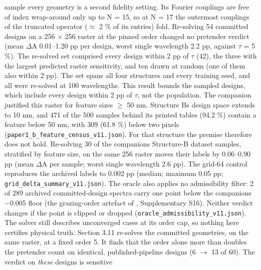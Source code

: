 \documentclass[11pt,a4paper]{article}
\begin{document}
\begin{itemize}
  sample every geometry is a second fidelity setting. Its Fourier couplings are free of
  index wrap-around only up to N = 15, so at N = 17 the outermost couplings of the
  truncated operator (\ensuremath{\approx} 2 \% of its entries) fold. Re-solving 54 committed designs on a
  256 \ensuremath{\times} 256 raster at the pinned order changed no pretender verdict (mean \textbar \ensuremath{\Delta}A\textbar{}
  0.01--1.20 pp per design, worst single wavelength 2.2 pp, against \ensuremath{\tau} = 5 \%). The re-solved
  set comprised every design within 2 pp of \ensuremath{\tau} (42), the three with the largest predicted
  raster sensitivity, and ten drawn at random (one of them also within 2 pp). The set
  spans all four structures and every training seed, and all were re-solved at 100
  wavelengths. This result bounds the sampled designs, which include every design within
  2 pp of \ensuremath{\tau}, not the population. The companion justified this raster for feature
  sizes \ensuremath{\geq} 50 nm. Structure B\textquotesingle s design space extends to 10 nm, and 471 of the 500 samples
  behind its printed tables (94.2 \%) contain a feature below 50 nm, with 309 (61.8 \%)
  below two pixels (\texttt{paper1\_\allowbreak{}b\_\allowbreak{}feature\_\allowbreak{}census\_\allowbreak{}v11.\allowbreak{}json}). For that structure the premise
  therefore does not hold. Re-solving 30 of the companion\textquotesingle s Structure-B dataset samples,
  stratified by feature size, on the same 256 raster moves their labels by 0.06--0.90 pp
  (mean \textbar \ensuremath{\Delta}A\textbar{} per sample; worst single wavelength 2.6 pp). The grid-64 control reproduces
  the archived labels to 0.002 pp (median; maximum 0.05 pp;
  \texttt{grid\_\allowbreak{}delta\_\allowbreak{}summary\_\allowbreak{}v11.\allowbreak{}json}). The oracle also applies no admissibility filter:
  2 of 289 archived committed-design spectra carry one point below the companion\textquotesingle s \ensuremath{-}0.005
  floor (the grazing-order artefact of \cite{choi20261}, Supplementary S16). Neither verdict changes if
  the point is clipped or dropped (\texttt{oracle\_\allowbreak{}admissibility\_\allowbreak{}v11.\allowbreak{}json}). The solver still
  describes unconverged cases at its order cap, so nothing here certifies physical truth.
  Section 3.11 re-solves the committed geometries, on the same raster, at a fixed order 5.
  It finds that the order alone more than doubles the pretender count on identical,
  published-pipeline designs (6 \ensuremath{\rightarrow} 13 of 60). The verdict on \emph{these} designs is sensitive

\end{itemize}
\end{document}
